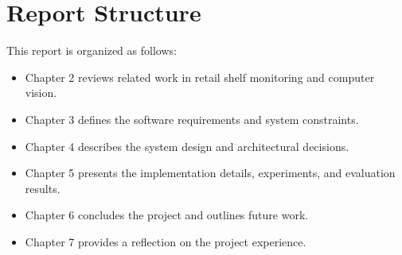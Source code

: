 \section{Report Structure}

This report is organized as follows:
\begin{itemize}
    \item Chapter 2 reviews related work in retail shelf monitoring and computer vision.
    \item Chapter 3 defines the software requirements and system constraints.
    \item Chapter 4 describes the system design and architectural decisions.
    \item Chapter 5 presents the implementation details, experiments, and evaluation results.
    \item Chapter 6 concludes the project and outlines future work.
    \item Chapter 7 provides a reflection on the project experience.
\end{itemize}
